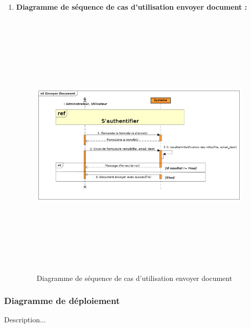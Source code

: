 \begin{enumerate}
		 	
		 		\item \textbf{Diagramme de séquence de cas d'utilisation envoyer document :}
		 	\begin{figure}[H]
		 		\centering
		 		\includegraphics[width=18cm, height=13cm]{../Diagrammes/DiagrammeSequences/EnvoyerDocument.png}
		 		\caption{Diagramme de séquence de cas d'utilisation envoyer document}
		 		\label{diaseq6}
		 	\end{figure}
		 	
		 	
		 \end{enumerate}

		\subsubsection{Diagramme de déploiement}
		Description...
		
